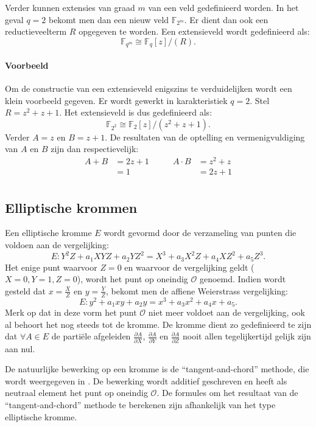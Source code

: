Verder kunnen extensies van graad $m$ van een veld gedefinieerd worden. In het geval $q = 2$ bekomt men dan een nieuw veld $\mathbb{F}_{2^m}$. Er dient dan ook een reductieveelterm $R$ opgegeven te worden. Een extensieveld wordt gedefinieerd als:
\[\mathbb{F}_{q^m} \cong \mathbb{F}_q [z] / (R). \]

\paragraph{Voorbeeld} Om de constructie van een extensieveld enigszins te verduidelijken wordt een klein voorbeeld gegeven. Er wordt gewerkt in karakteristiek $q = 2$. Stel $R = z^2 + z + 1$. Het extensieveld is dus gedefinieerd als:
\[\mathbb{F}_{2^2} \cong \mathbb{F}_2 [z] / (z^2 + z + 1). \]
Verder $A = z$ en $B = z + 1$. De resultaten van de optelling en vermenigvuldiging van $A$ en $B$ zijn dan respectievelijk:
\[\begin{aligned}
A + B &= 2z + 1 \qquad & A \cdot B &= z^2 + z\\
&= 1	& &= 2z + 1\\
\end{aligned}\]

\subsection{Elliptische krommen}

Een elliptische kromme $E$ wordt gevormd door de verzameling van punten die voldoen aan de vergelijking:
\[E: Y^2 Z + a_1 XYZ + a_2 Y Z^2 = X^3 + a_3 X^2 Z + a_4 X Z^2 + a_5 Z^3.\]
Het enige punt waarvoor $Z = 0$ en waarvoor de vergelijking geldt ($X = 0,  Y = 1, Z = 0$), wordt het punt op oneindig $\mathcal{O}$ genoemd. Indien wordt gesteld dat $x = \frac{X}{Z}$ en $y = \frac{Y}{Z}$, bekomt men de affiene Weierstrass vergelijking:
\[E: y^2 + a_1 xy + a_2 y = x^3 + a_3 x^2 + a_4 x + a_5.\]
Merk op dat in deze vorm het punt $\mathcal{O}$ niet meer voldoet aan de vergelijking, ook al behoort het nog steeds tot de kromme. De kromme dient zo gedefinieerd te zijn dat $\forall A \in E$ de parti\"ele afgeleiden $\frac{\partial A}{\partial X}$, $\frac{\partial A}{\partial Y}$ en $\frac{\partial A}{\partial Z}$ nooit allen tegelijkertijd gelijk zijn aan nul.

De natuurlijke bewerking op een kromme is de ``tangent-and-chord'' methode, die wordt weergegeven in . De bewerking wordt additief geschreven en heeft als neutraal element het punt op oneindig $\mathcal{O}$. De formules om het resultaat van de ``tangent-and-chord'' methode te berekenen zijn afhankelijk van het type elliptische kromme.

